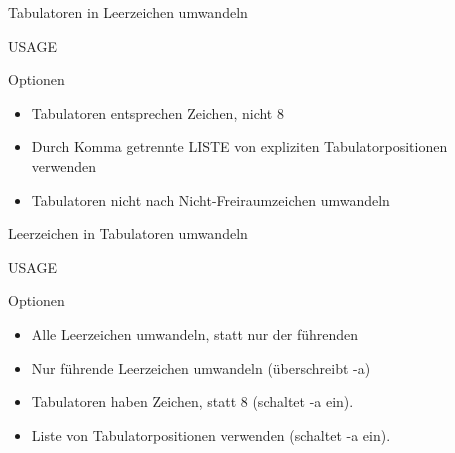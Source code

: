 \documentclass[aspectratio=43]{beamer}
\begin{document}
\begin{frame} 
	\begin{block}{} 
        Tabulatoren in Leerzeichen umwandeln
	\end{block}
	\begin{block}{USAGE} 
	\end{block}
	\begin{exampleblock}{Optionen} 
	\begin{itemize}
		\item {} \newline Tabulatoren entsprechen  Zeichen, nicht 8
	\item {} \newline Durch  Komma  getrennte LISTE von expliziten Tabulatorpositionen verwenden
	\item {} \newline Tabulatoren nicht nach  Nicht-Freiraumzeichen umwandeln
	\end{itemize}
	
	\end{exampleblock}
\end{frame}

\begin{frame} 
	\begin{block}{} 
        Leerzeichen in Tabulatoren umwandeln
	\end{block}
	\begin{block}{USAGE} 
	\end{block}
	\begin{exampleblock}{Optionen} 
	\begin{itemize}
	\item {} \newline Alle Leerzeichen umwandeln, statt nur der führenden
	\item {} \newline Nur führende Leerzeichen umwandeln (überschreibt -a)
	\item {} \newline Tabulatoren haben  Zeichen, statt 8 (schaltet -a ein).
	\item {} \newline Liste von Tabulatorpositionen  verwenden (schaltet -a ein).
	\end{itemize}
	
	\end{exampleblock}
\end{frame}
\end{document}
